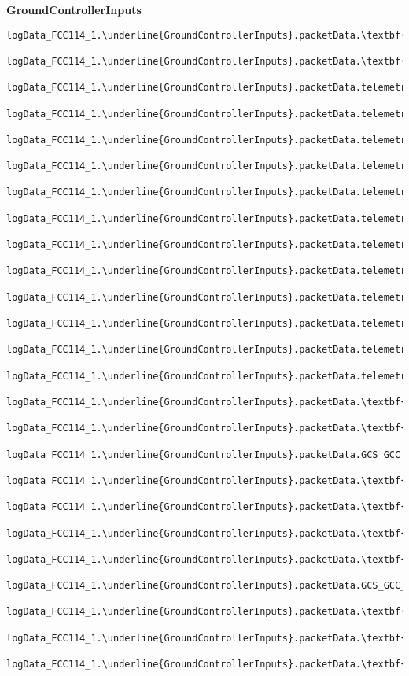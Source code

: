 \documentclass[10pt]{extarticle}
\begin{document}
{\Large \textbf{GroundControllerInputs}}
 \begin{Verbatim}[baselinestretch=.9,commandchars=\\\{\}]
logData_FCC114_1.\underline{GroundControllerInputs}.packetData.\textbf{UTC_Time}

logData_FCC114_1.\underline{GroundControllerInputs}.packetData.\textbf{DF_telemetry}

logData_FCC114_1.\underline{GroundControllerInputs}.packetData.telemetry
    logData_FCC114_1.\underline{GroundControllerInputs}.packetData.telemetry.\textbf{GCC_ControlFlags}
    logData_FCC114_1.\underline{GroundControllerInputs}.packetData.telemetry.\textbf{systemState}
    logData_FCC114_1.\underline{GroundControllerInputs}.packetData.telemetry.\textbf{trueAirspeed}
    logData_FCC114_1.\underline{GroundControllerInputs}.packetData.telemetry.altitude
        logData_FCC114_1.\underline{GroundControllerInputs}.packetData.telemetry.\textbf{altitude.value}
    logData_FCC114_1.\underline{GroundControllerInputs}.packetData.telemetry.\textbf{velocityPlaneGround}
    logData_FCC114_1.\underline{GroundControllerInputs}.packetData.telemetry.\textbf{distancePlaneGround}
    logData_FCC114_1.\underline{GroundControllerInputs}.packetData.telemetry.accelerationPlaneGround
        logData_FCC114_1.\underline{GroundControllerInputs}.packetData.telemetry.\textbf{accelerationPlaneGround.value}
    logData_FCC114_1.\underline{GroundControllerInputs}.packetData.telemetry.controlDemand
        logData_FCC114_1.\underline{GroundControllerInputs}.packetData.telemetry.\textbf{controlDemand.value}

logData_FCC114_1.\underline{GroundControllerInputs}.packetData.\textbf{telemetryUTC_Time}

logData_FCC114_1.\underline{GroundControllerInputs}.packetData.\textbf{DF_GCS_GCC_StateCommand}

logData_FCC114_1.\underline{GroundControllerInputs}.packetData.GCS_GCC_StateCommand
    logData_FCC114_1.\underline{GroundControllerInputs}.packetData.\textbf{GCS_GCC_StateCommand.UTC_Time}
    logData_FCC114_1.\underline{GroundControllerInputs}.packetData.\textbf{GCS_GCC_StateCommand.commandFlag}
    logData_FCC114_1.\underline{GroundControllerInputs}.packetData.\textbf{GCS_GCC_StateCommand.data}

logData_FCC114_1.\underline{GroundControllerInputs}.packetData.\textbf{DF_GCS_GCC_Command}

logData_FCC114_1.\underline{GroundControllerInputs}.packetData.GCS_GCC_Command
    logData_FCC114_1.\underline{GroundControllerInputs}.packetData.\textbf{GCS_GCC_Command.UTC_Time}
    logData_FCC114_1.\underline{GroundControllerInputs}.packetData.\textbf{GCS_GCC_Command.commandID}
    logData_FCC114_1.\underline{GroundControllerInputs}.packetData.\textbf{GCS_GCC_Command.data}


\end{Verbatim}
\end{document}
